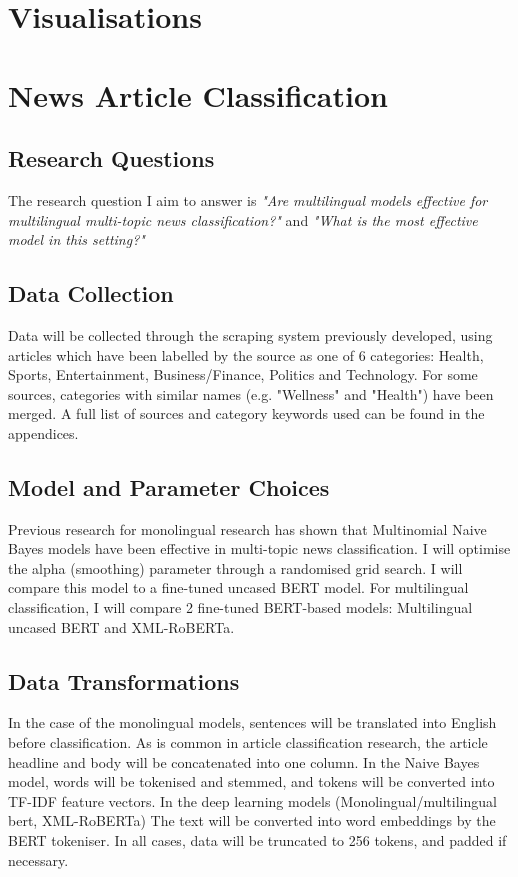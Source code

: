 \documentclass{l4proj}
\begin{document}
\section{Visualisations}

\section{News Article Classification}
\subsection{Research Questions}
The research question I aim to answer is \emph{"Are multilingual models effective for multilingual multi-topic news classification?"} and \emph{"What is the most effective model in this setting?"}
\subsection{Data Collection}
Data will be collected through the scraping system previously developed, using articles which have been labelled by the source as one of 6 categories: Health, Sports, Entertainment, Business/Finance, Politics and Technology. For some sources, categories with similar names (e.g. "Wellness" and "Health") have been merged. A full list of sources and category keywords used can be found in the appendices.
\subsection{Model and Parameter Choices}
Previous research for monolingual research has shown that Multinomial Naive Bayes models have been effective in multi-topic news classification. I will optimise the alpha (smoothing) parameter through a randomised grid search. I will compare this model to a fine-tuned uncased BERT model. For multilingual classification, I will compare 2 fine-tuned BERT-based models: Multilingual uncased BERT and XML-RoBERTa.
\subsection{Data Transformations}
In the case of the monolingual models, sentences will be translated into English before classification. As is common in article classification research, the article headline and body will be concatenated into one column. In the Naive Bayes model, words will be tokenised and stemmed, and tokens will be converted into TF-IDF feature vectors. In the deep learning models (Monolingual/multilingual bert, XML-RoBERTa) The text will be converted into word embeddings by the BERT tokeniser. In all cases, data will be truncated to 256 tokens, and padded if necessary.
\end{document}
